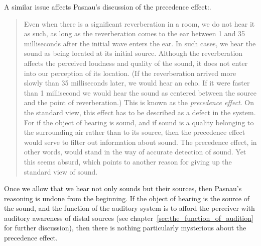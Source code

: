A similar issue affects Pasnau's discussion of the precedence effect:. 
\begin{quote}
	Even when there is a significant reverberation in a room, we do not hear it as such, as long as the reverberation comes to the ear between 1 and 35 milliseconds after the initial wave enters the ear. In such cases, we hear the sound as being located at its initial source. Although the reverberation affects the perceived loudness and quality of the sound, it does not enter into our perception of its location. (If the reverberation arrived more slowly than 35 milliseconds later, we would hear an echo. If it were faster than 1 millisecond we would hear the sound as centered between the source and the point of reverberation.) This is known as the \emph{precedence effect}. On the standard view, this effect has to be described as a defect in the system. For if the object of hearing is sound, and if sound is a quality belonging to the surrounding air rather than to its source, then the precedence effect would serve to filter out information about sound. The precedence effect, in other words, would stand in the way of accurate detection of sound. Yet this seems absurd, which points to another reason for giving up the standard view of sound. \citep[312--313]{Pasnau:1999ss}
\end{quote}
Once we allow that we hear not only sounds but their sources, then Pasnau's reasoning is undone from the beginning. If the object of hearing is the source of the sound, and the function of the auditory system is to afford the perceiver with auditory awareness of distal sources (see chapter~\ref{sec:the_function_of_audition} for further discussion), then there is nothing particularly mysterious about the precedence effect.

